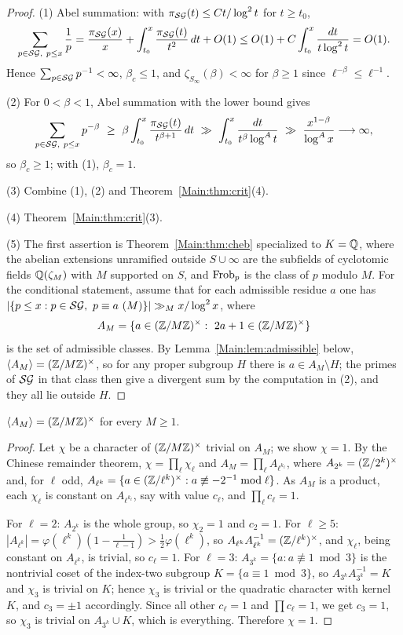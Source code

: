 \begin{proof}
(1) Abel summation: with $\pi_{\mathcal{SG}}(t)\le Ct/\log^2t$ for $t\ge t_0$,
\[
\sum_{p\in\mathcal{SG},\ p\le x}\frac1p=\frac{\pi_{\mathcal{SG}}(x)}{x}+\int_{t_0}^x\frac{\pi_{\mathcal{SG}}(t)}{t^2}\,dt+O(1)
\le O(1)+C\int_{t_0}^x\frac{dt}{t\log^2t}=O(1).
\]
Hence $\sum_{p\in\mathcal{SG}}p^{-1}<\infty$, $\beta_c\le1$, and
$\zeta_{S_\infty}(\beta)<\infty$ for $\beta\ge1$ since $\ell^{-\beta}\le\ell^{-1}$.

(2) For $0<\beta<1$, Abel summation with the lower bound gives
\[
\sum_{p\in\SG,\ p\le x}p^{-\beta}\ \ge\ \beta\int_{t_0}^x\frac{\pi_\SG(t)}{t^{\beta+1}}\,dt
\ \gg\ \int_{t_0}^x\frac{dt}{t^{\beta}\log^At}\ \gg\ \frac{x^{1-\beta}}{\log^Ax}\longrightarrow\infty,
\]
so $\beta_c\ge1$; with (1), $\beta_c=1$.

(3) Combine (1), (2) and Theorem~\ref{Main:thm:crit}(4).

(4) Theorem~\ref{Main:thm:crit}(3).

(5) The first assertion is Theorem~\ref{Main:thm:cheb} specialized to $K=\mathbb{Q}$, where
the abelian extensions unramified outside $S\cup\infty$ are the subfields of
cyclotomic fields $\mathbb{Q}(\zeta_M)$ with $M$ supported on $S$, and $\operatorname{Frob}_p$ is the
class of $p$ modulo $M$. For the conditional statement, assume that for each
admissible residue $a$ one has
$|\{p\le x:p\in\SG,\ p\equiv a\ (M)\}|\gg_Mx/\log^2x$, where
\[
A_M=\{a\in(\Z/M\Z)^\times:\ 2a+1\in(\Z/M\Z)^\times\}
\]
is the set of admissible classes. By Lemma~\ref{Main:lem:admissible} below,
$\langle A_M\rangle=(\mathbb{Z}/M\mathbb{Z})^\times$, so for any proper subgroup $H$ there is
$a\in A_M\setminus H$; the primes of $\mathcal{SG}$ in that class then give a divergent
sum by the computation in (2), and they all lie outside $H$.
\end{proof}

\begin{lemma}\label{Main:lem:admissible}
$\langle A_M\rangle=(\mathbb{Z}/M\mathbb{Z})^\times$ for every $M\ge1$.
\end{lemma}

\begin{proof}
Let $\chi$ be a character of $(\mathbb{Z}/M\mathbb{Z})^\times$ trivial on $A_M$; we show
$\chi=1$. By the Chinese remainder theorem, $\chi=\prod_\ell\chi_\ell$ and
$A_M=\prod_\ell A_{\ell^{k_\ell}}$, where $A_{2^k}=(\mathbb{Z}/2^k)^\times$ and, for
$\ell$ odd, $A_{\ell^k}=\{a\in(\mathbb{Z}/\ell^k)^\times:a\not\equiv-2^{-1}\bmod\ell\}$.
As $A_M$ is a product, each $\chi_\ell$ is constant on $A_{\ell^{k_\ell}}$, say
with value $c_\ell$, and $\prod_\ell c_\ell=1$.

For $\ell=2$: $A_{2^k}$ is the whole group, so $\chi_2=1$ and $c_2=1$. For
$\ell\ge5$: $|A_{\ell^k}|=\varphi(\ell^k)(1-\frac{1}{\ell-1})>\frac12\varphi(\ell^k)$,
so $A_{\ell^k}A_{\ell^k}^{-1}=(\mathbb{Z}/\ell^k)^\times$, and $\chi_\ell$, being
constant on $A_{\ell^k}$, is trivial, so $c_\ell=1$. For $\ell=3$:
$A_{3^k}=\{a:a\not\equiv1\bmod3\}$ is the nontrivial coset of the index-two
subgroup $K=\{a\equiv1\bmod3\}$, so $A_{3^k}A_{3^k}^{-1}=K$ and $\chi_3$ is
trivial on $K$; hence $\chi_3$ is trivial or the quadratic character with
kernel $K$, and $c_3=\pm1$ accordingly. Since all other $c_\ell=1$ and
$\prod c_\ell=1$, we get $c_3=1$, so $\chi_3$ is trivial on $A_{3^k}\cup K$,
which is everything. Therefore $\chi=1$.
\end{proof}

